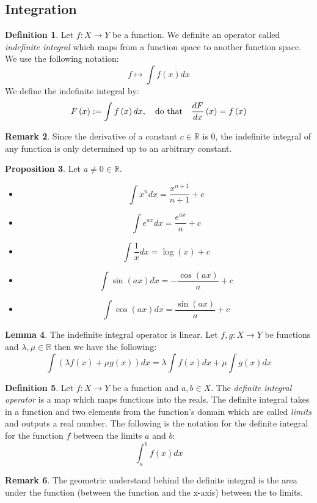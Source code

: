 \documentclass[11pt]{article}
\theoremstyle{definition}
\newtheorem{prop}{Proposition}[section]
\newtheorem{lemma}[prop]{Lemma}
\newtheorem{rmk}[prop]{Remark}
\newtheorem{defn}[prop]{Definition}
\newcommand{\brac}[1]{\left(#1\right)}
\newcommand{\diff}[2]{\frac{d\ifthenelse{\equal{#1}{}}{}{#1}}{d#2}}
\newcommand{\R}{\mathbb{R}}
\begin{document}
\subsection{Integration}
	\begin{defn}
		Let $f:X\rightarrow Y$ be a function. We definite an operator called \emph{indefinite integral} which maps from a function space to another function space. We use the following notation:
		$$f\mapsto \int f\brac{x}dx$$
		We define the indefinite integral by:
		$$ F\brac{x} := \int f\brac{x}dx, \quad \text{do that}  \quad \diff{F}{x}\brac{x} = f\brac{x}$$
	\end{defn}
	\begin{rmk}
		Since the derivative of a constant $c\in\R$ is 0, the indefinite integral of any function is only determined up to an arbitrary constant.
	\end{rmk}
	\begin{prop}
		Let $a\neq 0\in\R$.
		\begin{itemize}
			\item $$\int x^n dx = \frac{x^{n+1}}{n+1} + c$$
			\item $$\int e^{ax} dx = \frac{e^{ax}}{a} + c$$
			\item $$\int \frac{1}{x} dx = \log\brac{x} + c$$
			\item $$\int \sin\brac{ax} dx = -\frac{\cos\brac{ax}}{a} + c$$
			\item $$\int \cos\brac{ax} dx = \frac{\sin\brac{ax}}{a} + c$$
		\end{itemize}
	\end{prop}
	\begin{lemma}
		The indefinite integral operator is linear. Let $f,g:X\rightarrow Y$ be functions and $\lambda,\mu\in\R$ then we have the following:
		$$ \int \brac{\lambda f\brac{x} + \mu g\brac{x}}dx = \lambda\int f\brac{x}dx + \mu\int g\brac{x}dx$$
	\end{lemma}
	\begin{defn}
		Let $f:X\rightarrow Y$ be a function and $a,b\in X$. The \emph{definite integral operator} is a map which maps functions into the reals. The definite integral takes in a function and two elements from the function's domain which are called \emph{limits} and outputs a real number. The following is the notation for the definite integral for the function $f$ between the limits $a$ and $b$:
		$$\int_{a}^{b} f\brac{x} dx$$
	\end{defn}
	\begin{rmk}
		The geometric understand behind the definite integral is the area under the function (between the function and the x-axis) between the to limits.
	\end{rmk}
\end{document}
